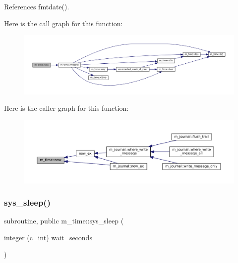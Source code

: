References fmtdate().

Here is the call graph for this function\+:\nopagebreak
\begin{figure}[H]
\begin{center}
\leavevmode
\includegraphics[width=350pt]{namespacem__time_a6b5e87be0e510ff268c1ecfbf67a3bdb_cgraph}
\end{center}
\end{figure}
Here is the caller graph for this function\+:\nopagebreak
\begin{figure}[H]
\begin{center}
\leavevmode
\includegraphics[width=350pt]{namespacem__time_a6b5e87be0e510ff268c1ecfbf67a3bdb_icgraph}
\end{center}
\end{figure}
\mbox{\label{namespacem__time_aeb65659c500dd201910f3615858f9b73}} 
\subsubsection{\texorpdfstring{sys\+\_\+sleep()}{sys\_sleep()}}
{\footnotesize\ttfamily subroutine, public m\+\_\+time\+::sys\+\_\+sleep (\begin{DoxyParamCaption}\item[{integer (c\+\_\+int)}]{wait\+\_\+seconds }\end{DoxyParamCaption})}

\mbox{\label{namespacem__time_a6c01c810eb2acce767d2f24b9aaefa56}} 
